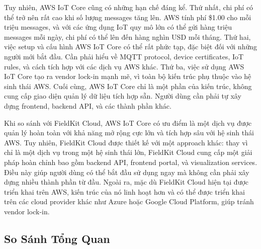 Tuy nhiên, AWS IoT Core cũng có những hạn chế đáng kể. Thứ nhất, chi phí có thể trở nên rất cao khi số lượng messages tăng lên. AWS tính phí \$1.00 cho mỗi triệu messages, và với các ứng dụng IoT quy mô lớn có thể gửi hàng triệu messages mỗi ngày, chi phí có thể lên đến hàng nghìn USD mỗi tháng. Thứ hai, việc setup và cấu hình AWS IoT Core có thể rất phức tạp, đặc biệt đối với những người mới bắt đầu. Cần phải hiểu về MQTT protocol, device certificates, IoT rules, và cách tích hợp với các dịch vụ AWS khác. Thứ ba, việc sử dụng AWS IoT Core tạo ra vendor lock-in mạnh mẽ, vì toàn bộ kiến trúc phụ thuộc vào hệ sinh thái AWS. Cuối cùng, AWS IoT Core chỉ là một phần của kiến trúc, không cung cấp giao diện quản lý dữ liệu tích hợp sẵn. Người dùng cần phải tự xây dựng frontend, backend API, và các thành phần khác.

Khi so sánh với FieldKit Cloud, AWS IoT Core có ưu điểm là một dịch vụ được quản lý hoàn toàn với khả năng mở rộng cực lớn và tích hợp sâu với hệ sinh thái AWS. Tuy nhiên, FieldKit Cloud được thiết kế với một approach khác: thay vì chỉ là một dịch vụ trong một hệ sinh thái lớn, FieldKit Cloud cung cấp một giải pháp hoàn chỉnh bao gồm backend API, frontend portal, và visualization services. Điều này giúp người dùng có thể bắt đầu sử dụng ngay mà không cần phải xây dựng nhiều thành phần từ đầu. Ngoài ra, mặc dù FieldKit Cloud hiện tại được triển khai trên AWS, kiến trúc của nó linh hoạt hơn và có thể được triển khai trên các cloud provider khác như Azure hoặc Google Cloud Platform, giúp tránh vendor lock-in.

\subsection{So Sánh Tổng Quan}

